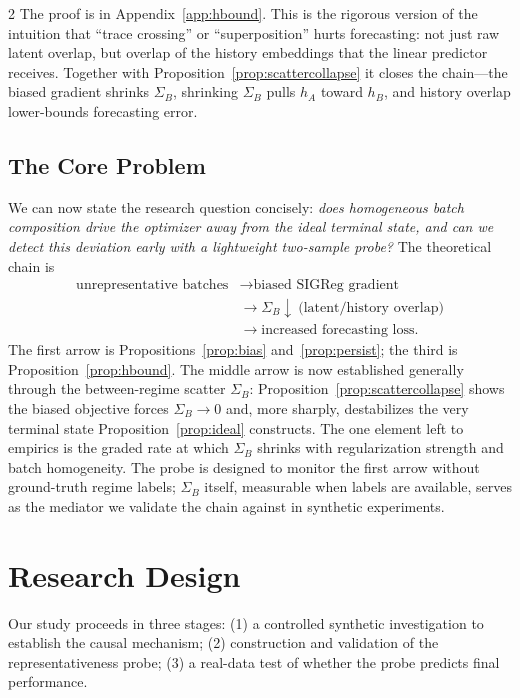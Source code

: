 \documentclass[10pt]{article}
\theoremstyle{remark}
\begin{document}
\begin{multicols*}{2}
The proof is in Appendix~\ref{app:hbound}. This is the rigorous version of the intuition that ``trace crossing'' or ``superposition'' hurts forecasting: not just raw latent overlap, but overlap of the history embeddings that the linear predictor receives. Together with Proposition~\ref{prop:scattercollapse} it closes the chain---the biased gradient shrinks $\Sigma_B$, shrinking $\Sigma_B$ pulls $h_A$ toward $h_B$, and history overlap lower-bounds forecasting error.

\subsection{The Core Problem}

We can now state the research question concisely: \emph{does homogeneous batch composition drive the optimizer away from the ideal terminal state, and can we detect this deviation early with a lightweight two-sample probe?} The theoretical chain is
{\footnotesize
\[
\begin{aligned}
\text{unrepresentative batches} &\longrightarrow \text{biased SIGReg gradient} \\
&\longrightarrow \Sigma_B \downarrow\ \text{(latent/history overlap)} \\
&\longrightarrow \text{increased forecasting loss}.
\end{aligned}
\]}
The first arrow is Propositions~\ref{prop:bias} and~\ref{prop:persist}; the third is Proposition~\ref{prop:hbound}. The middle arrow is now established generally through the between-regime scatter $\Sigma_B$: Proposition~\ref{prop:scattercollapse} shows the biased objective forces $\Sigma_B \to 0$ and, more sharply, destabilizes the very terminal state Proposition~\ref{prop:ideal} constructs. The one element left to empirics is the graded rate at which $\Sigma_B$ shrinks with regularization strength and batch homogeneity. The probe is designed to monitor the first arrow without ground-truth regime labels; $\Sigma_B$ itself, measurable when labels are available, serves as the mediator we validate the chain against in synthetic experiments.

\section{Research Design}
\label{sec:design}

Our study proceeds in three stages: (1) a controlled synthetic investigation to establish the causal mechanism; (2) construction and validation of the representativeness probe; (3) a real-data test of whether the probe predicts final performance.


\end{multicols*}
\end{document}
